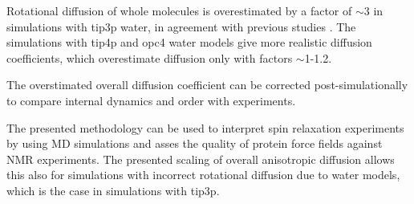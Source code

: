 \documentclass[pre,aps,floatfix,authordate1-4,twocolumn]{revtex4-1}
\begin{document}
Rotational diffusion of whole molecules is overestimated by a factor
of $\sim$3 in simulations with tip3p water, in agreement with previous
studies \cite{??}. The simulations with tip4p and opc4 water models
give more realistic diffusion coefficients, which overestimate diffusion
only with factors $\sim$1-1.2. 

The overstimated overall diffusion
coefficient can be corrected post-simulationally to compare internal dynamics
and order with experiments. 

The presented methodology can be used to interpret spin relaxation experiments
by using MD simulations \cite{??} and asses the quality of protein force fields
against NMR experiments. The presented scaling of overall anisotropic diffusion
allows this also for simulations with incorrect rotational diffusion due to water
models, which is the case in simulations with tip3p. 

\begin{acknowledgments}
\end{acknowledgments}





\end{document}
